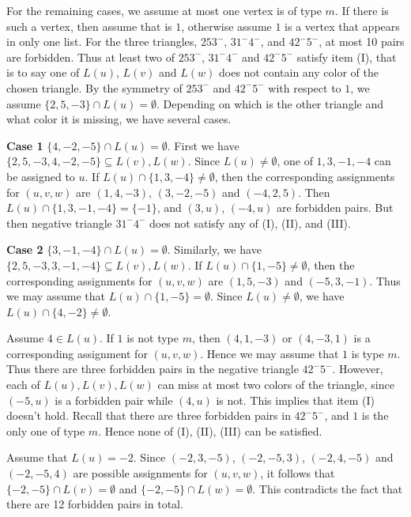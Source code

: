 \documentclass[11pt,a4paper]{article}
\makeatletter
\renewenvironment{proof}[1][\proofname]{\par
	\pushQED{\qed}%
	\normalfont \topsep6\p@\@plus6\p@\relax
	\trivlist
	\item[\hskip\labelsep
	\bfseries
	#1\@addpunct{.}]\ignorespaces
}{%
	\popQED\endtrivlist\@endpefalse
}
\theoremstyle{definition}
\makeatother
\begin{document}
\begin{proof}
		
		For the remaining cases, we assume at most one vertex is of type $m$. If there is such a vertex, then assume that is $1$, otherwise assume $1$ is a vertex that appears in only one list. For the three triangles, $253^-$, $31^-4^-$, and $42^-5^-$, at most 10 pairs are forbidden. Thus at least two of $253^-$, $31^-4^-$ and $42^-5^-$ satisfy item (I), that is to say one of $L(u)$, $L(v)$ and $L(w)$ does not contain any color of the chosen triangle. By the symmetry of $253^-$ and $42^-5^-$ with respect to $1$, we assume $\{2,5,-3\}\cap L(u)=\emptyset$. Depending on which is the other triangle and what color it is missing, we have several cases.
		
		{\bf Case 1} $\{4, -2, -5\}\cap L(u)=\emptyset$.
		First we have $\{2, 5, -3, 4, -2, -5\}\subseteq L(v), L(w)$. Since $L(u)\neq \emptyset$, one of $1, 3,-1,-4$ can be assigned to $u$. If $L(u)\cap \{1, 3,-4\}\neq \emptyset$, then the corresponding assignments for $(u,v,w)$ are $(1,4,-3)$,  $(3,-2,-5)$ and  $(-4,2,5)$. Then $L(u)\cap \{1, 3, -1, -4\} =\{-1\}$, and $(3,u)$, $(-4,u)$ are forbidden pairs. But then negative triangle $31^{-}4^{-}$ does not satisfy any of (I), (II), and (III).	
				
		{\bf Case 2} $\{3, -1, -4 \}\cap L(u)=\emptyset$. 
			Similarly, we have $\{2, 5, -3, 3, -1, -4\}\subseteq L(v), L(w)$. If $L(u)\cap \{1, -5\}\neq \emptyset$, then the corresponding assignments for $(u,v,w)$ are $(1,5,-3)$ and  $(-5,3,-1)$. Thus we may assume that $L(u)\cap \{1, -5\}= \emptyset$. Since $L(u)\neq \emptyset$, we have $L(u)\cap \{4,-2\}\neq \emptyset$. 
			
    Assume $4 \in L(u)$. If $1$ is not type $m$, then  $(4, 1, -3)$ or  $(4, -3,1)$ is a corresponding assignment for $(u,v,w)$. Hence we may assume that $1$ is type $m$. Thus there are three forbidden pairs in the negative triangle $42^{-}5^{-}$. However, each of $L(u), L(v), L(w)$ can miss at most two colors of the triangle, since $(-5,u)$ is a forbidden pair while $(4,u)$ is not. This implies that item (I) doesn't hold. Recall that there are three forbidden pairs in $42^{-}5^{-}$, and $1$ is the only one of type $m$. Hence none of (I), (II), (III) can be satisfied.
    
    Assume that $L(u)=-2$. Since $(-2, 3, -5)$, $(-2, -5, 3)$, $(-2, 4, -5)$ and $(-2, -5, 4)$ are possible assignments for $(u,v,w)$, it follows that $\{-2, -5\}\cap L(v)=\emptyset$ and $\{-2, -5\}\cap L(w)=\emptyset$. This contradicts the fact that there are 12 forbidden pairs in total.
					

\end{proof}
\end{document}
